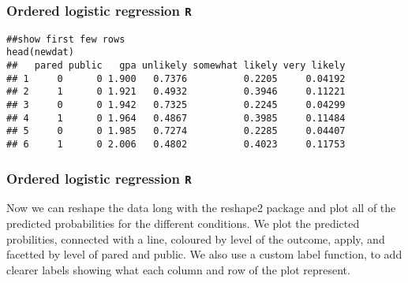 \documentclass[00-GLMregslides.tex]{subfiles}
\begin{document}
\begin{frame}[fragile]
	\frametitle{Ordered logistic regression \texttt{R} }
	\Large
\begin{framed}
\begin{verbatim}
##show first few rows
head(newdat)
##   pared public   gpa unlikely somewhat likely very likely
## 1     0      0 1.900   0.7376          0.2205     0.04192
## 2     1      0 1.921   0.4932          0.3946     0.11221
## 3     0      0 1.942   0.7325          0.2245     0.04299
## 4     1      0 1.964   0.4867          0.3985     0.11484
## 5     0      0 1.985   0.7274          0.2285     0.04407
## 6     1      0 2.006   0.4802          0.4023     0.11753
\end{verbatim}
\end{framed}

\end{frame}

\begin{frame}[fragile]
	\frametitle{Ordered logistic regression \texttt{R} }
	\Large
Now we can reshape the data long with the reshape2 package and plot all of the predicted probabilities for the different conditions. We plot the predicted probilities, connected with a line, coloured by level of the outcome, apply, and facetted by level of pared and public. We also use a custom label function, to add clearer labels showing what each column and row of the plot represent.

\end{frame}
\end{document}
